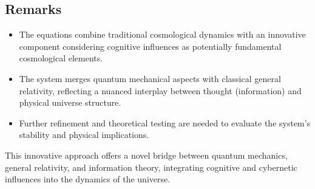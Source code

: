 \documentclass{article}
\begin{document}
\subsection*{Remarks}

\begin{itemize}
    \item The equations combine traditional cosmological dynamics with an innovative component considering cognitive influences as potentially fundamental cosmological elements.
    \item The system merges quantum mechanical aspects with classical general relativity, reflecting a nuanced interplay between thought (information) and physical universe structure.
    \item Further refinement and theoretical testing are needed to evaluate the system's stability and physical implications.
\end{itemize}

This innovative approach offers a novel bridge between quantum mechanics, general relativity, and information theory, integrating cognitive and cybernetic influences into the dynamics of the universe.
\end{document}
